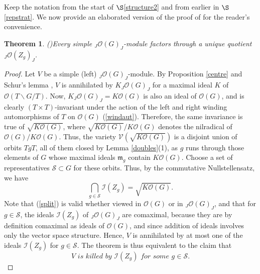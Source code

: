 \documentclass{amsart}
\numberwithin{equation}{section}
\newtheorem{theorem}{Theorem}[section]
\theoremstyle{definition}
\begin{document}
Keep the notation from the start of $\S$\ref{structure2} and from earlier in $\S$\ref{repstrat}. We now provide an elaborated version of the proof of \cite[Theorem 5.1]{G2} for the reader's convenience.

\begin{theorem}{\rm (\cite[Theorem 5.1]{G2})}\label{strata} 
Every simple ${}_J\mathcal{O}(G)_J$-module factors through a unique quotient ${}_J\mathcal{O}(Z_g)_J$.
\end{theorem}

\begin{proof} 
Let $V$ be a simple (left) ${}_J\mathcal{O}(G)_J$-module. By Proposition \ref{centre} and Schur's lemma \cite[Proposition 9.1.7]{McCR}, $V$ is annihilated by $K{}_J\mathcal{O}(G)_J$ for a maximal ideal $K$ of $\mathcal{O}(T\backslash G \slash T)$. Now, $K{}_J\mathcal{O}(G)_J = K\mathcal{O}(G)$ is also an ideal of $\mathcal{O}(G)$, and is clearly $(T \times T)$-invariant under the action of the left and right winding automorphisms of $T$ on $\mathcal{O}(G)$ (\ref{windaut}). Therefore, the same invariance is true of $\sqrt{ K\mathcal{O}(G)}$, where $\sqrt{ K\mathcal{O}(G)}/K\mathcal{O}(G)$ denotes the nilradical of $\mathcal{O}(G)/K\mathcal{O}(G)$. Thus, the variety $\mathcal{V}(\sqrt{ K\mathcal{O}(G)})$ is a disjoint union of orbits $TgT$, all of them closed by Lemma \ref{doubles}(1), as $g$ runs through those elements of $G$ whose maximal ideals $\mathfrak{m}_g$ contain $K\mathcal{O}(G)$. Choose a set of representatives $\mathcal{S} \subset G$ for these orbits. Thus, by the commutative Nullstellensatz, we have 
\begin{equation}\label{split} \bigcap_{g \in \mathcal{S}} \mathcal{I}(Z_g)=\sqrt{ K\mathcal{O}(G)}.
\end{equation}
Note that (\ref{split}) is valid whether viewed in $\mathcal{O}(G)$ or in ${}_J\mathcal{O}(G)_J$, and that for $g \in \mathcal{S}$, the ideals $\mathcal{I}(Z_g)$ of ${}_J\mathcal{O}(G)_J$ are comaximal, because they are by definition comaximal as ideals of $\mathcal{O}(G)$, and since addition of ideals involves only the vector space structure. Hence, $V$ is annihilated by at most one of the ideals $\mathcal{I}(Z_g)$ for $g \in \mathcal{S}$. The theorem is thus equivalent to the claim that
\begin{equation}\label{crux} V \textit{ is killed by } \mathcal{I}(Z_g) \textit{ for some } g \in \mathcal{S}.
\end{equation}


\end{proof}
\end{document}
